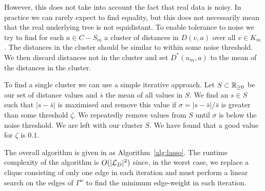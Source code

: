 However, this does not take into account the fact that real data is noisy.  In
practice we can rarely expect to find equality, but this does not necessarily
mean that the real underlying tree is not equidistant.  To enable tolerance to
noise we try to find for each $a \in C - S_m$ a cluster of distances in
$D(v,a)$ over all $v \in K_m$.  The distances in the cluster should be similar
to within some noise threshold.  We then discard distances not in the cluster
and set $D^*(u_m,a)$ to the mean of the distances in the cluster.

To find a single cluster we can use a simple iterative approach.  Let $S
\subset {\mathbb R}_{\geq 0}$ be our set of distance values and $\bar{s}$ the mean of all
values in $S$.  We find an $s \in S$ such that $|s - \bar{s}|$ is maximised
and remove this value if $\sigma = |s - \bar{s}|/\bar{s}$ is greater than some
threshold $\zeta$.  We repeatedly remove values from $S$ until $\sigma$ is
below the noise threshold.  We are left with our cluster $S$.  We have found
that a good value for $\zeta$ is $0.1$.

The overall algorithm is given in as Algorithm~\ref{alg:lasso}.  The runtime
complexity of the algorithm is $O(|{\mathcal L}_D|^2)$ since, in the worst case, we
replace a clique consisting of only one edge in each iteration and must
perform a linear search on the edges of $\Gamma^\omega$ to find the minimum
edge-weight in each iteration.

